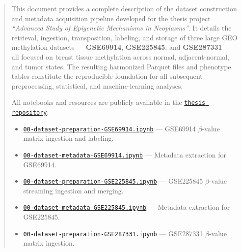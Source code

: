 \documentclass[10pt]{extarticle}
\begin{document}
\begin{abstract}
This document provides a complete description of the dataset construction and metadata acquisition pipeline developed for the thesis project \emph{“Advanced Study of Epigenetic Mechanisms in Neoplasms”}.  
It details the retrieval, ingestion, transposition, labeling, and storage of three large GEO methylation datasets — \textbf{GSE69914}, \textbf{GSE225845}, and \textbf{GSE287331} — all focused on breast tissue methylation across normal, adjacent-normal, and tumor states.  
The resulting harmonized Parquet files and phenotype tables constitute the reproducible foundation for all subsequent preprocessing, statistical, and machine-learning analyses.

All notebooks and resources are publicly available in the \href{https://github.com/elisabettaroviera/THESIS/tree/main}{\texttt{thesis repository}}:
\begin{itemize}[label=-]
  \item \href{https://github.com/elisabettaroviera/THESIS/blob/main/01%20-%20Notebook/00%20-%20Dataset%20Construction%20%26%20Metadata/GSE69914/00-dataset-preparation-GSE69914.ipynb}{\texttt{00-dataset-preparation-GSE69914.ipynb}} — GSE69914 $\beta$-value matrix ingestion and labeling.

  \item \href{https://github.com/elisabettaroviera/THESIS/blob/main/01%20-%20Notebook/00%20-%20Dataset%20Construction%20%26%20Metadata/GSE69914/00-dataset-metadata-GSE69914.ipynb}{\texttt{00-dataset-metadata-GSE69914.ipynb}} — Metadata extraction for GSE69914.

  \item \href{https://github.com/elisabettaroviera/THESIS/blob/main/01%20-%20Notebook/00%20-%20Dataset%20Construction%20%26%20Metadata/GSE225845/00-dataset-preparation-GSE225845.ipynb}{\texttt{00-dataset-preparation-GSE225845.ipynb}} — GSE225845 $\beta$-value streaming ingestion and merging.

  \item \href{https://github.com/elisabettaroviera/THESIS/blob/main/01%20-%20Notebook/00%20-%20Dataset%20Construction%20%26%20Metadata/GSE225845/00-dataset-metadata-GSE225845.ipynb}{\texttt{00-dataset-metadata-GSE225845.ipynb}} — Metadata extraction for GSE225845.

  \item \href{https://github.com/elisabettaroviera/THESIS/blob/main/01%20-%20Notebook/00%20-%20Dataset%20Construction%20%26%20Metadata/GSE287331/00-dataset-preparation-GSE287331.ipynb}{\texttt{00-dataset-preparation-GSE287331.ipynb}} — GSE287331 $\beta$-value matrix ingestion.


\end{itemize}
\end{abstract}
\end{document}
